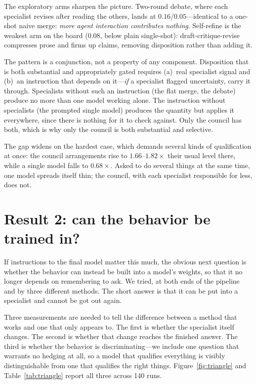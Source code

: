 \documentclass[11pt]{article}
\begin{document}
The exploratory arms sharpen the picture. Two-round debate, where each
specialist revises after reading the others, lands at $0.16/0.05$---identical to
a one-shot naive merge: \emph{more agent interaction contributes nothing}.
Self-refine is the weakest arm on the board ($0.08$, below plain single-shot):
draft-critique-revise compresses prose and firms up claims, removing disposition
rather than adding it.

The pattern is a conjunction, not a property of any component. Disposition that
is both substantial and appropriately gated requires (a)~real specialist signal
and (b)~an instruction that depends on it---\emph{if} a specialist flagged
uncertainty, carry it through. Specialists without such an instruction (the
flat merge, the debate) produce no more than one model working alone. The
instruction without specialists (the prompted single model) produces the
quantity but applies it everywhere, since there is nothing for it to check
against. Only the council has both, which is why only the council is both
substantial and selective.

The gap widens on the hardest case, which demands several kinds of
qualification at once: the council arrangements rise to $1.66$--$1.82\times$
their usual level there, while a single model falls to $0.68\times$. Asked to
do several things at the same time, one model spreads itself thin; the
council, with each specialist responsible for less, does not.

\section{Result 2: can the behavior be trained in?}
\label{sec:install}
If instructions to the final model matter this much, the obvious next question
is whether the behavior can instead be built into a model's weights, so that
it no longer depends on remembering to ask. We tried, at both ends of the
pipeline and by three different methods. The short answer is that it can be
put into a specialist and cannot be got out again.

Three measurements are needed to tell the difference between a method that
works and one that only appears to. The first is whether the specialist itself
changes. The second is whether that change reaches the finished answer. The
third is whether the behavior is discriminating---we include one question that
warrants no hedging at all, so a model that qualifies everything is visibly
distinguishable from one that qualifies the right things. Figure~\ref{fig:triangle}
and Table~\ref{tab:triangle} report all three across 140 runs.
\end{document}
